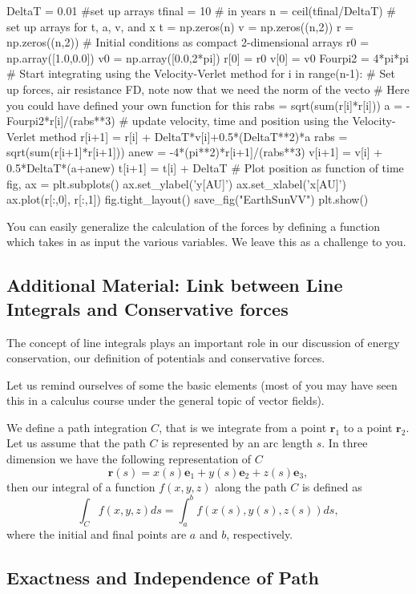 \documentclass[%
oneside,                 %
final,                   %
10pt]{article}
\begin{document}
\bpycod
DeltaT = 0.01
#set up arrays 
tfinal = 10 # in years
n = ceil(tfinal/DeltaT)
# set up arrays for t, a, v, and x
t = np.zeros(n)
v = np.zeros((n,2))
r = np.zeros((n,2))
# Initial conditions as compact 2-dimensional arrays
r0 = np.array([1.0,0.0])
v0 = np.array([0.0,2*pi])
r[0] = r0
v[0] = v0
Fourpi2 = 4*pi*pi
# Start integrating using the Velocity-Verlet  method
for i in range(n-1):
    # Set up forces, air resistance FD, note now that we need the norm of the vecto
    # Here you could have defined your own function for this
    rabs = sqrt(sum(r[i]*r[i]))
    a =  -Fourpi2*r[i]/(rabs**3)
    # update velocity, time and position using the Velocity-Verlet method
    r[i+1] = r[i] + DeltaT*v[i]+0.5*(DeltaT**2)*a
    rabs = sqrt(sum(r[i+1]*r[i+1]))
    anew = -4*(pi**2)*r[i+1]/(rabs**3)
    v[i+1] = v[i] + 0.5*DeltaT*(a+anew)
    t[i+1] = t[i] + DeltaT
# Plot position as function of time    
fig, ax = plt.subplots()
ax.set_ylabel('y[AU]')
ax.set_xlabel('x[AU]')
ax.plot(r[:,0], r[:,1])
fig.tight_layout()
save_fig("EarthSunVV")
plt.show()

\epycod


You can easily generalize the calculation of the forces by defining a function
which takes in as input the various variables. We leave this as a challenge to you.

\subsection{Additional Material: Link between Line Integrals and Conservative forces}

The concept of line integrals plays an important role in our discussion of energy conservation,
our definition of potentials and conservative forces.

Let us remind ourselves of some the basic elements (most of you may
have seen this in a calculus course under the general topic of vector
fields).

We define a path integration $C$, that is we integrate
from a point $\bm{r}_1$ to a point $\bm{r}_2$. 
Let us assume that the path $C$ is represented by an arc length $s$. In three dimension we have the following representation of $C$
\[
\bm{r}(s)=x(s)\bm{e}_1+y(s)\bm{e}_2+z(s)\bm{e}_3,
\]
then our integral of a function $f(x,y,z)$ along the path $C$ is defined as 
\[
\int_Cf(x,y,z)ds=\int_a^bf\left(x(s),y(s),z(s)\right)ds,
\]
where the initial and final points are $a$ and $b$, respectively.
\subsection{Exactness and Independence of Path}
\end{document}
